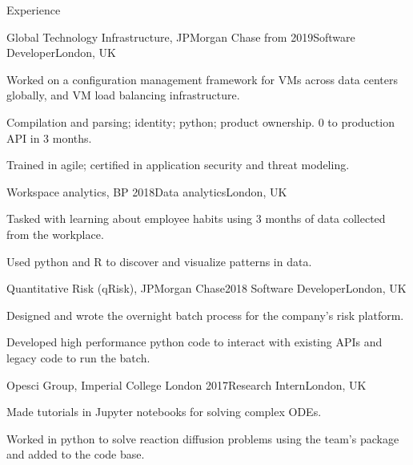 \documentclass[10pt]{resume} %
\begin{document}
\begin{rSection}{Experience}


  \begin{rSubsection}{Global Technology Infrastructure, JPMorgan Chase}
    {from 2019}{Software Developer}{London, UK}
  \item Worked on a configuration management framework for VMs across data
    centers globally, and VM load balancing infrastructure.
  \item Compilation and parsing; identity; python; product ownership. 0 to
    production API in 3 months.
  \item Trained in agile; certified in application security and threat modeling.
  \end{rSubsection}


  \begin{rSubsection}{Workspace analytics, BP}
    {2018}{Data analytics}{London, UK}
  \item Tasked with learning about employee habits using 3 months of data
    collected from the workplace.
  \item Used python and R to discover and visualize patterns in data.
  \end{rSubsection}


  \begin{rSubsection}{Quantitative Risk (qRisk), JPMorgan Chase}{2018}
    {Software Developer}{London, UK}
    \item Designed and wrote the overnight batch process for the company's risk
      platform.
    \item Developed high performance python code to interact with existing APIs
      and legacy code to run the batch.
  \end{rSubsection}


  \begin{rSubsection}{Opesci Group, Imperial College London}
    {2017}{Research Intern}{London, UK}
      \item Made tutorials in Jupyter notebooks for solving complex ODEs.
      \item Worked in python to solve reaction diffusion problems using the
      team's package and added to the code base.
  \end{rSubsection}


\end{rSection}
\end{document}
